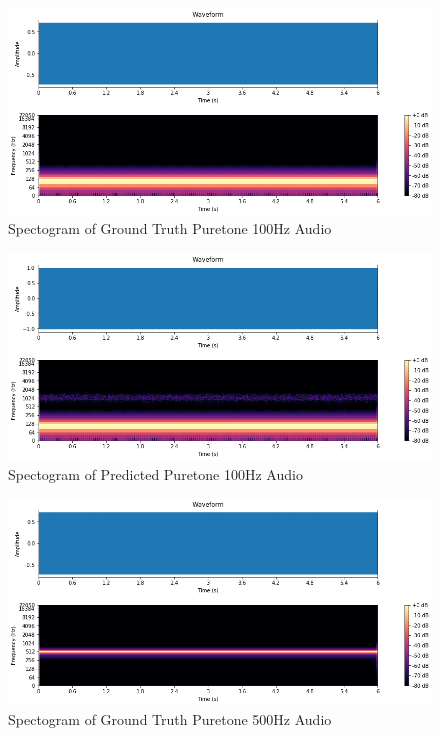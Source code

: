\documentclass{ioereport}
\begin{document}
    \begin{figure}[H]
        \centering
        \includegraphics[width=\linewidth]{assets/audio_results/puretone100hz.png}
        \caption{Spectogram of Ground Truth Puretone 100Hz Audio}
        \label{fig:gt-pure100-spec}
    \end{figure}
    
    \begin{figure}[H]
        \centering
        \includegraphics[width=\linewidth]{assets/audio_results/puretone100hzpred.png}
        \caption{Spectogram of Predicted Puretone 100Hz Audio}
        \label{fig:pred-pure100-spec}
    \end{figure}

     \begin{figure}[H]
        \centering
        \includegraphics[width=\linewidth]{assets/audio_results/puretone500hz.png}
        \caption{Spectogram of Ground Truth Puretone 500Hz Audio}
        \label{fig:gt-pure500-spec}
    \end{figure}
    
\end{document}
